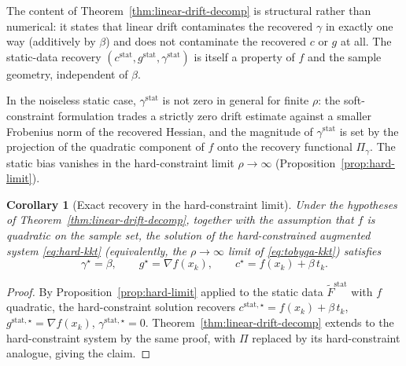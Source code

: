 \documentclass[11pt,a4paper]{article}
\newtheorem{corollary}[theorem]{Corollary}
\begin{document}
The content of Theorem~\ref{thm:linear-drift-decomp} is structural
rather than numerical: it states that linear drift contaminates
the recovered $\gamma$ in exactly one way (additively by $\beta$)
and does not contaminate the recovered $c$ or $g$ at all. The
static-data recovery
$(c^{\mathrm{stat}}, g^{\mathrm{stat}}, \gamma^{\mathrm{stat}})$
is itself a property of $f$ and the sample geometry, independent
of $\beta$.

In the noiseless static case, $\gamma^{\mathrm{stat}}$ is
not zero in general for finite $\rho$: the soft-constraint
formulation trades a strictly zero drift estimate against a
smaller Frobenius norm of the recovered Hessian, and the magnitude
of $\gamma^{\mathrm{stat}}$ is set by the projection of the
quadratic component of $f$ onto the recovery functional
$\Pi_\gamma$. The static bias vanishes in the hard-constraint limit
$\rho \to \infty$ (Proposition~\ref{prop:hard-limit}).

\begin{corollary}[Exact recovery in the hard-constraint limit]
\label{cor:linear-drift-exact-limit}
Under the hypotheses of Theorem~\ref{thm:linear-drift-decomp},
together with the assumption that $f$ is quadratic on the sample
set, the solution of the hard-constrained augmented system
\eqref{eq:hard-kkt} (equivalently, the $\rho \to \infty$ limit
of \eqref{eq:tobyqa-kkt}) satisfies
\[
  \gamma^\star = \beta,
  \qquad
  g^\star = \nabla f(x_k),
  \qquad
  c^\star = f(x_k) + \beta\,t_k.
\]
\end{corollary}

\begin{proof}
By Proposition~\ref{prop:hard-limit} applied to the static data
$\tilde F^{\mathrm{stat}}$ with $f$ quadratic, the
hard-constraint solution recovers
$c^{\mathrm{stat},\star} = f(x_k) + \beta\,t_k$,
$g^{\mathrm{stat},\star} = \nabla f(x_k)$,
$\gamma^{\mathrm{stat},\star} = 0$.
Theorem~\ref{thm:linear-drift-decomp} extends to the
hard-constraint system by the same proof, with $\Pi$ replaced by
its hard-constraint analogue, giving the claim.
\end{proof}
\end{document}
